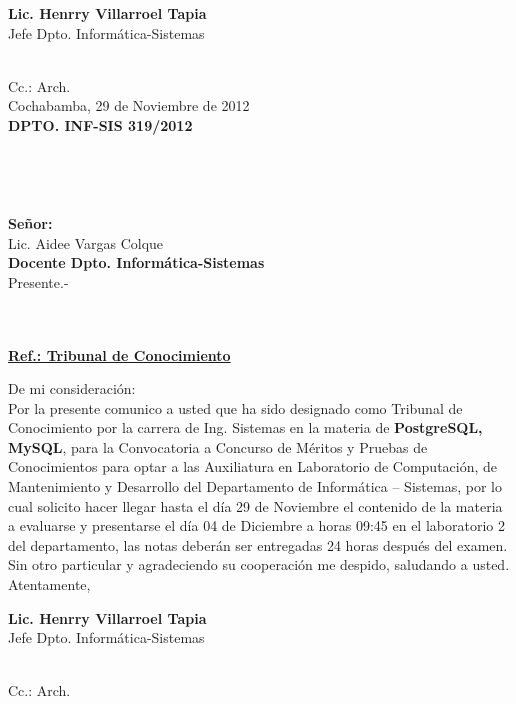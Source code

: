 \documentclass[letterpaper,11pt]{letter}
\begin{document}
\vspace{3.5cm}
\begin{center}
\begin{minipage}[b]{0.5\textwidth}
\begin{center}
{\bf Lic. Henrry Villarroel Tapia}\\
Jefe Dpto. Informática-Sistemas\\
\end{center}
\end{minipage}
\end{center}
~\\
Cc.: Arch.\\
\newpage
Cochabamba, 29 de Noviembre de 2012~\\
 \textbf{DPTO. INF-SIS 319/2012}\\
~\\
~\\
~\\
~\\
 \textbf{Señor:}~\\
Lic. Aidee Vargas Colque~\\
 \textbf{Docente Dpto. Informática-Sistemas}~\\
Presente.-\\
~\\
~\\
\begin{center}
\underline{ \textbf{Ref.: Tribunal de Conocimiento}}
\end{center}
De mi consideración:\\
Por la presente comunico a usted que ha sido designado como Tribunal de Conocimiento por la carrera de Ing. Sistemas en la materia de \textbf{PostgreSQL, MySQL}, para la Convocatoria a Concurso de Méritos y Pruebas de Conocimientos para optar a las Auxiliatura en Laboratorio de Computación, de Mantenimiento y Desarrollo del Departamento de Informática – Sistemas, por lo cual solicito hacer llegar hasta el día 29 de Noviembre el contenido de la materia a evaluarse y presentarse el día 04 de Diciembre a horas 09:45 en el laboratorio 2 del departamento, las notas deberán ser entregadas 24 horas después del examen.\\
Sin otro particular y agradeciendo su cooperación me despido, saludando a usted.\\
Atentamente,\\

\vspace{3.5cm}
\begin{center}
\begin{minipage}[b]{0.5\textwidth}
\begin{center}
{\bf Lic. Henrry Villarroel Tapia}\\
Jefe Dpto. Informática-Sistemas\\
\end{center}
\end{minipage}
\end{center}
~\\
Cc.: Arch.\\
\newpage
\end{document}

